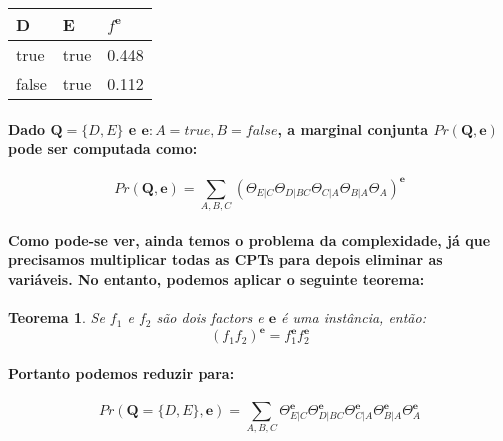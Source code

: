 \documentclass[a4paper,10pt]{article}
\theoremstyle{plain}
\newtheorem*{spn-thm}{Teorema}
\begin{document}
\begin{table}[h]
  \begin{center}
    \begin{tabular}{*{2}{l} | l}
      D & E & $f^\textbf{e}$ \\
      \hline
      true & true & 0.448 \\
      false & true & 0.112 \\
    \end{tabular}
  \end{center}
\end{table}

\paragraph{
  Dado $\textbf{Q} = \{D, E\}$ e $\textbf{e}: A = true, B = false$, a marginal conjunta 
  $Pr(\textbf{Q}, \textbf{e})$ pode ser computada como:
}

\begin{equation}
  Pr(\textbf{Q}, \textbf{e}) = \sum_{A, B, C} (\Theta_{E|C} \Theta_{D|BC} \Theta_{C|A} \Theta_{B|A} \Theta_A)^\textbf{e}
\end{equation}

\paragraph{
  Como pode-se ver, ainda temos o problema da complexidade, já que precisamos multiplicar todas as
  CPTs para depois eliminar as variáveis. No entanto, podemos aplicar o seguinte teorema:
}

\begin{spn-thm} Se $f_1$ e $f_2$ são dois factors e $\textbf{e}$ é uma instância, então:
  \begin{equation}
    (f_1f_2)^\textbf{e} = f_1^\textbf{e}f_2^\textbf{e}
  \end{equation}
\end{spn-thm}

\paragraph{
  Portanto podemos reduzir para:
}

\begin{equation}
  Pr(\textbf{Q} = \{D, E\}, \textbf{e}) = \sum_{A, B, C} \Theta_{E|C}^\textbf{e} \Theta_{D|BC}^\textbf{e}
    \Theta_{C|A}^\textbf{e} \Theta_{B|A}^\textbf{e} \Theta_A^\textbf{e}
\end{equation}
\end{document}
